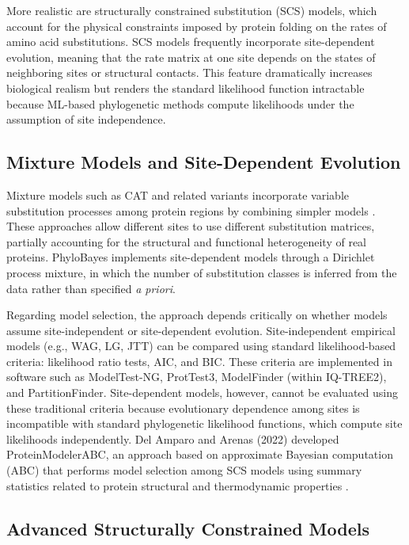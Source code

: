 More realistic are structurally constrained substitution (SCS) models, which account for the physical constraints imposed by protein folding on the rates of amino acid substitutions. SCS models frequently incorporate site-dependent evolution, meaning that the rate matrix at one site depends on the states of neighboring sites or structural contacts. This feature dramatically increases biological realism but renders the standard likelihood function intractable because ML-based phylogenetic methods compute likelihoods under the assumption of site independence.

\subsection{Mixture Models and Site-Dependent Evolution}

Mixture models such as CAT and related variants incorporate variable substitution processes among protein regions by combining simpler models \parencite{lartillot2004}. These approaches allow different sites to use different substitution matrices, partially accounting for the structural and functional heterogeneity of real proteins. PhyloBayes implements site-dependent models through a Dirichlet process mixture, in which the number of substitution classes is inferred from the data rather than specified \textit{a priori}.

Regarding model selection, the approach depends critically on whether models assume site-independent or site-dependent evolution. Site-independent empirical models (e.g., WAG, LG, JTT) can be compared using standard likelihood-based criteria: likelihood ratio tests, AIC, and BIC. These criteria are implemented in software such as ModelTest-NG, ProtTest3, ModelFinder (within IQ-TREE2), and PartitionFinder. Site-dependent models, however, cannot be evaluated using these traditional criteria because evolutionary dependence among sites is incompatible with standard phylogenetic likelihood functions, which compute site likelihoods independently. Del Amparo and Arenas (2022) developed ProteinModelerABC, an approach based on approximate Bayesian computation (ABC) that performs model selection among SCS models using summary statistics related to protein structural and thermodynamic properties \parencite{delamparo2022}.

\subsection{Advanced Structurally Constrained Models}


